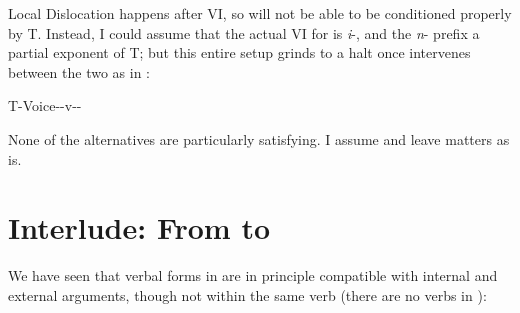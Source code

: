 \begin{exe}
\begin{xlist}
\begin{xlist}
\begin{exe}
\begin{xlist}
\begin{xlist}
\begin{exe}
\begin{xlist}
\begin{xlist}
\begin{exe}
\begin{exe}
\begin{xlist}
\begin{exe}
\begin{exe}
\begin{xlist}
\begin{exe}
\begin{exe}
\begin{exe}
\begin{exe}
\begin{exe}
\begin{xlist}
\begin{exe}
\begin{xlist}
\begin{exe}
\begin{exe}
\begin{xlist}
\begin{exe}
\begin{xlist}
\begin{exe}
\begin{xlist}
\begin{exe}
\begin{exe}
\begin{exe}
\begin{xlist}
\begin{exe}
\begin{exe}
\begin{exe}
\begin{xlist}
\begin{exe}
\begin{xlist}
\begin{exe}
\begin{exe}
\begin{xlist}
\begin{exe}
\begin{exe}
\begin{exe}
\begin{exe}
\begin{xlist}
\begin{exe}
\begin{xlist}
\begin{exe}
\begin{xlist}
\begin{exe}
\begin{xlist}
\begin{exe}
\begin{xlist}
\begin{exe}
\begin{xlist}
\begin{exe}
\begin{exe}
\begin{xlist}
\begin{exe}
\begin{xlist}
Local Dislocation happens after VI, so {\pz} will not be able to be conditioned properly by T. Instead, I could assume that the actual VI for {\pz} is \emph{i}-, and the \emph{n}- prefix a partial exponent of T; but this entire setup grinds to a halt once {\va} intervenes between the two as in {\thit}:
 \begin{exe}
\ex  T-Voice-{\va}-v-\pz- 
 \z 

None of the alternatives are particularly satisfying. I assume  and leave matters as is.


\section{Interlude: From {\tnif} to {\thit}} \label{vz:interim}
We have seen that verbal forms in {\tnif} are in principle compatible with internal and external arguments, though not within the same verb (there are no  verbs in {\tnif}):


\end{exe}
\end{xlist}
\end{exe}
\end{xlist}
\end{exe}
\end{exe}
\end{xlist}
\end{exe}
\end{xlist}
\end{exe}
\end{xlist}
\end{exe}
\end{xlist}
\end{exe}
\end{xlist}
\end{exe}
\end{xlist}
\end{exe}
\end{exe}
\end{exe}
\end{exe}
\end{xlist}
\end{exe}
\end{exe}
\end{xlist}
\end{exe}
\end{xlist}
\end{exe}
\end{exe}
\end{exe}
\end{xlist}
\end{exe}
\end{exe}
\end{exe}
\end{xlist}
\end{exe}
\end{xlist}
\end{exe}
\end{xlist}
\end{exe}
\end{exe}
\end{xlist}
\end{exe}
\end{xlist}
\end{exe}
\end{exe}
\end{exe}
\end{exe}
\end{exe}
\end{xlist}
\end{exe}
\end{exe}
\end{xlist}
\end{exe}
\end{exe}
\end{xlist}
\end{xlist}
\end{exe}
\end{xlist}
\end{xlist}
\end{exe}
\end{xlist}
\end{xlist}
\end{exe}
